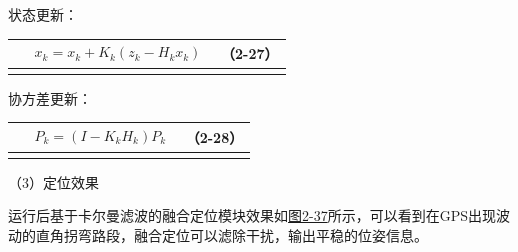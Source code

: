 状态更新：

{\def\LTcaptype{none} %
\begin{longtable}[]{@{}
  >{\raggedright\arraybackslash}p{}
  >{\raggedright\arraybackslash}p{}
  >{\raggedright\arraybackslash}p{}@{}}
\toprule\noalign{}
\begin{minipage}[b]{\linewidth}\centering
\end{minipage} & \begin{minipage}[b]{\linewidth}\centering
\[\begin{array}{r}
x_{k} = x_{k} + K_{k}\left( z_{k} - H_{k}x_{k} \right)
\end{array}\]
\end{minipage} & \begin{minipage}[b]{\linewidth}\raggedleft
（2-27）
\end{minipage} \\
\midrule\noalign{}
\endhead
\bottomrule\noalign{}
\endlastfoot
\end{longtable}
}

协方差更新：

{\def\LTcaptype{none} %
\begin{longtable}[]{@{}
  >{\raggedright\arraybackslash}p{}
  >{\raggedright\arraybackslash}p{}
  >{\raggedright\arraybackslash}p{}@{}}
\toprule\noalign{}
\begin{minipage}[b]{\linewidth}\centering
\end{minipage} & \begin{minipage}[b]{\linewidth}\centering
\[\begin{array}{r}
P_{k} = \left( I - K_{k}H_{k} \right)P_{k}
\end{array}\]
\end{minipage} & \begin{minipage}[b]{\linewidth}\raggedleft
（2-28）
\end{minipage} \\
\midrule\noalign{}
\endhead
\bottomrule\noalign{}
\endlastfoot
\end{longtable}
}

（3）定位效果

运行后基于卡尔曼滤波的融合定位模块效果如\hyperref[_Ref201344298]{图2-37}所示，可以看到在GPS出现波动的直角拐弯路段，融合定位可以滤除干扰，输出平稳的位姿信息。

